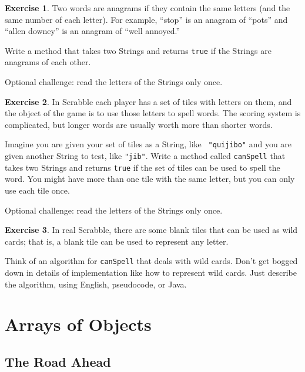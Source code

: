 \documentclass[12pt]{book}
\theoremstyle{definition}
\newtheorem{excz}{Exercise}[chapter]
\newenvironment{exercise}{\bigskip\begin{excz}\mbox{}}{\end{excz}}
\begin{document}
\begin{exercise}
Two words are anagrams if they contain the same letters (and the
same number of each letter).  For example, ``stop'' is an anagram
of ``pots'' and ``allen downey'' is an anagram of ``well annoyed.''

Write a method that takes two Strings and returns {\tt true} if
the Strings are anagrams of each other.

Optional challenge: read the letters of the Strings only once.
\end{exercise}


\begin{exercise}
In Scrabble each player has a set of tiles with letters on them, and
the object of the game is to use those letters to spell words.  The
scoring system is complicated, but longer words are usually
worth more than shorter words.

Imagine you are given your set of tiles as a String, like {\tt
"quijibo"} and you are given another String to test, like {\tt "jib"}.
Write a method called {\tt canSpell} that takes two Strings and
returns {\tt true} if the set of tiles can be used to spell the word.  You
might have more than one tile with the same letter, but you can only
use each tile once.

Optional challenge: read the letters of the Strings only once.
\end{exercise}


\begin{exercise}
In real Scrabble, there are some blank tiles that can be used
as wild cards; that is, a blank tile can be used to represent
any letter.

Think of an algorithm for {\tt canSpell} that deals with wild
cards.  Don't get bogged down in details of implementation like
how to represent wild cards.  Just describe the algorithm, using
English, pseudocode, or Java.
\end{exercise}



\chapter{Arrays of Objects}
\label{chap11}


\section{The Road Ahead}
\end{document}
